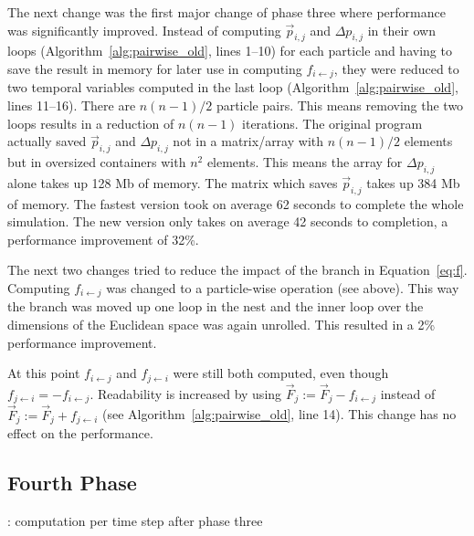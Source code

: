 \documentclass[twoside,11pt]{article}
\begin{document}
The next change was the first major change of phase three where
performance was significantly improved.
Instead of computing $\vec{p}_{i,j}$ and $\Delta p_{i,j}$ in their
own loops (Algorithm~\ref{alg:pairwise_old}, lines 1--10) for each
particle and having to save the result in memory for later use in
computing $f_{i \leftarrow j}$, they were reduced to two temporal
variables computed in the last loop (Algorithm~\ref{alg:pairwise_old},
lines 11--16).
There are $n(n-1)/2$ particle pairs.
This means removing the two loops results in a reduction of $n(n-1)$
iterations.
The original program actually saved $\vec{p}_{i,j}$ and
$\Delta p_{i,j}$ not in a matrix/array with $n(n-1)/2$ elements but
in oversized containers with $n^2$ elements.
This means the array for $\Delta p_{i,j}$ alone takes up 128 Mb
of memory.
The matrix which saves $\vec{p}_{i,j}$ takes up 384 Mb of memory.
The fastest version took on average 62 seconds to complete the whole
simulation.
The new version only takes on average 42 seconds to completion, a
performance improvement of 32\%.

The next two changes tried to reduce the impact of the branch in
Equation~\ref{eq:f}.
Computing $f_{i \leftarrow j}$ was changed to a particle-wise
operation (see above).
This way the branch was moved up one loop in the nest and the inner
loop over the dimensions of the Euclidean space was again unrolled.
This resulted in a 2\% performance improvement.

At this point $f_{i \leftarrow j}$ and $f_{j \leftarrow i}$ were
still both computed, even though
$f_{j \leftarrow i} = -f_{i \leftarrow j}$.
Readability is increased by using
$\vec{F}_j := \vec{F}_j - f_{i \leftarrow j}$ instead of
$\vec{F}_j := \vec{F}_j + f_{j \leftarrow i}$
(see Algorithm~\ref{alg:pairwise_old}, line 14).
This change has no effect on the performance.


\subsection{Fourth Phase} %

\begin{algorithm} %
  \caption{: computation per time step after phase three}
  \label{alg:new}

  \begin{algorithmic}[1]

      \ENDFOR
    \ENDFOR

    \ENDFOR

  \end{algorithmic}
\end{algorithm} %
\end{document}
